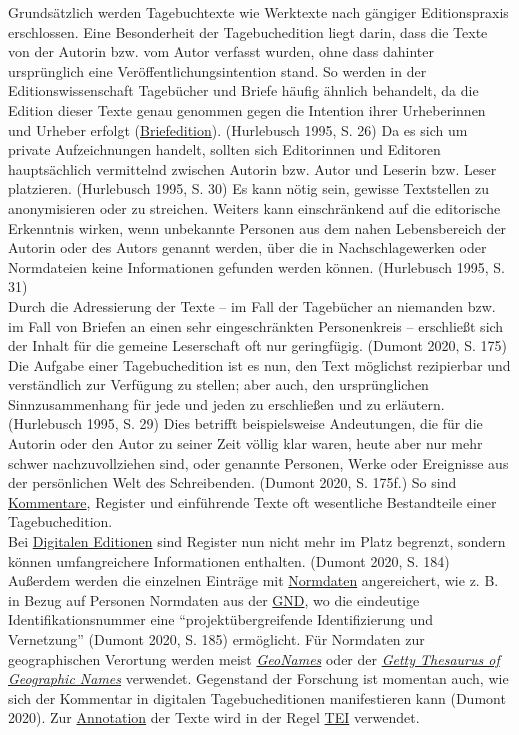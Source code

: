 \documentclass{article}
\begin{document}
    Grundsätzlich werden Tagebuchtexte wie Werktexte nach gängiger Editionspraxis erschlossen. Eine Besonderheit der Tagebuchedition liegt darin, dass die Texte von der Autorin bzw. vom Autor verfasst wurden, ohne dass dahinter ursprünglich eine Veröffentlichungsintention stand. So werden in der Editionswissenschaft Tagebücher und Briefe häufig ähnlich behandelt, da die Edition dieser Texte genau genommen gegen die Intention ihrer Urheberinnen und Urheber erfolgt (\href{http://gams.uni-graz.at/o:konde.39}{Briefedition}). (Hurlebusch 1995, S. 26) Da es sich um private Aufzeichnungen handelt, sollten sich Editorinnen und Editoren hauptsächlich vermittelnd zwischen Autorin bzw. Autor und Leserin bzw. Leser platzieren. (Hurlebusch 1995, S. 30) Es kann nötig sein, gewisse Textstellen zu anonymisieren oder zu streichen. Weiters kann einschränkend auf die editorische Erkenntnis wirken, wenn unbekannte Personen aus dem nahen Lebensbereich der Autorin oder des Autors genannt werden, über die in Nachschlagewerken oder Normdateien keine Informationen gefunden werden können. (Hurlebusch 1995, S. 31)\\
            
        Durch die Adressierung der Texte – im Fall der Tagebücher an niemanden bzw. im Fall von Briefen an einen sehr eingeschränkten Personenkreis – erschließt sich der Inhalt für die gemeine Leserschaft oft nur geringfügig. (Dumont 2020, S. 175) Die Aufgabe einer Tagebuchedition ist es nun, den Text möglichst rezipierbar und verständlich zur Verfügung zu stellen; aber auch, den ursprünglichen Sinnzusammenhang für jede und jeden zu erschließen und zu erläutern. (Hurlebusch 1995, S. 29) Dies betrifft beispielsweise Andeutungen, die für die Autorin oder den Autor zu seiner Zeit völlig klar waren, heute aber nur mehr schwer nachzuvollziehen sind, oder genannte Personen, Werke oder Ereignisse aus der persönlichen Welt des Schreibenden. (Dumont 2020, S. 175f.) So sind \href{http://gams.uni-graz.at/o:konde.34}{Kommentare}, Register und einführende Texte oft wesentliche Bestandteile einer Tagebuchedition. \\
            
        Bei \href{http://gams.uni-graz.at/o:konde.59}{Digitalen Editionen} sind Register nun nicht mehr im Platz begrenzt, sondern können umfangreichere Informationen enthalten. (Dumont 2020, S. 184) Außerdem werden die einzelnen Einträge mit \href{http://gams.uni-graz.at/o:konde.147}{Normdaten} angereichert, wie z. B. in Bezug auf Personen Normdaten aus der \href{http://gams.uni-graz.at/o:konde.109}{GND}, wo die eindeutige Identifikationsnummer eine “projektübergreifende Identifizierung und Vernetzung” (Dumont 2020, S. 185) ermöglicht. Für Normdaten zur geographischen Verortung werden meist \emph{\href{http://gams.uni-graz.at/o:konde.107}{GeoNames}} oder der \emph{\href{http://gams.uni-graz.at/o:konde.108}{Getty Thesaurus of Geographic Names}} verwendet. Gegenstand der Forschung ist momentan auch, wie sich der Kommentar in digitalen Tagebucheditionen manifestieren kann (Dumont 2020). Zur \href{http://gams.uni-graz.at/o:konde.17}{Annotation} der Texte wird in der Regel \href{http://gams.uni-graz.at/o:konde.178}{TEI} verwendet.\\
            
\end{document}
